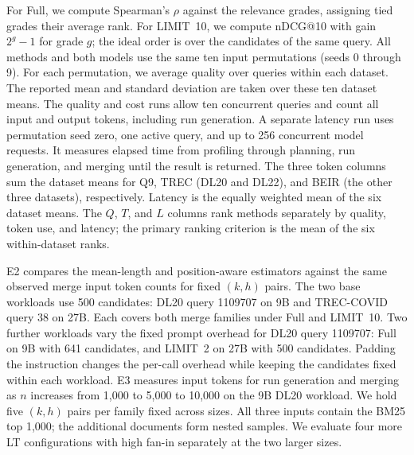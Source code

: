 For Full, we compute Spearman's $\rho$ against the relevance grades, assigning tied grades their average rank. For \textsf{LIMIT}~10, we compute nDCG@10 with gain $2^g-1$ for grade $g$; the ideal order is over the candidates of the same query. All methods and both models use the same ten input permutations (seeds 0 through 9). For each permutation, we average quality over queries within each dataset. The reported mean and standard deviation are taken over these ten dataset means.
The quality and cost runs allow ten concurrent queries and count all input and output tokens, including run generation. A separate latency run uses permutation seed zero, one active query, and up to 256 concurrent model requests. It measures elapsed time from profiling through planning, run generation, and merging until the result is returned.
The three token columns sum the dataset means for Q9, TREC (DL20 and DL22), and BEIR (the other three datasets), respectively. Latency is the equally weighted mean of the six dataset means. The $Q$, $T$, and $L$ columns rank methods separately by quality, token use, and latency; the primary ranking criterion is the mean of the six within-dataset ranks.

E2 compares the mean-length and position-aware estimators against the same observed merge input token counts for fixed $(k,h)$ pairs. The two base workloads use 500 candidates: DL20 query 1109707 on 9B and TREC-COVID query 38 on 27B. Each covers both merge families under Full and \textsf{LIMIT}~10.
Two further workloads vary the fixed prompt overhead for DL20 query 1109707: Full on 9B with 641 candidates, and \textsf{LIMIT}~2 on 27B with 500 candidates. Padding the instruction changes the per-call overhead while keeping the candidates fixed within each workload.
E3 measures input tokens for run generation and merging as $n$ increases from 1,000 to 5,000 to 10,000 on the 9B DL20 workload. We hold five $(k,h)$ pairs per family fixed across sizes. All three inputs contain the BM25 top 1,000; the additional documents form nested samples. We evaluate four more LT configurations with high fan-in separately at the two larger sizes.

